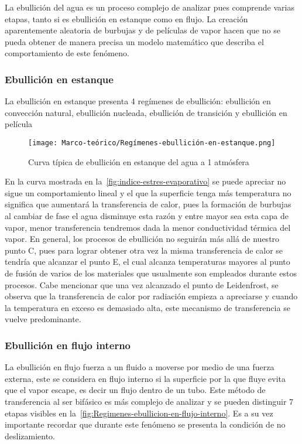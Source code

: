 		La ebullición del agua es un proceso complejo de analizar pues comprende varias etapas, tanto si es ebullición en estanque como en flujo. La creación aparentemente aleatoria de burbujas y de películas de vapor hacen que no se pueda obtener de manera precisa un modelo matemático que describa el comportamiento de este fenómeno.

		\subsubsection{Ebullición en estanque}

			La ebullición en estanque presenta 4 regímenes de ebullición: ebullición en convección natural, ebullición nucleada, ebullición de transición y ebullición en película

			\begin{figure}[ht]
				\centering
				\texttt{[image: Marco-teórico/Regímenes-ebullición-en-estanque.png]}
				\caption{Curva típica de ebullición en estanque del agua a 1 atmósfera}
				\label{fig:regimenes-ebullicion-en-estanque}
			\end{figure}

			En la curva mostrada en la~\cref{fig:indice-estres-evaporativo} se puede apreciar no sigue un comportamiento lineal y el que la superficie tenga más temperatura no significa que aumentará la transferencia de calor, pues la formación de burbujas al cambiar de fase el agua disminuye esta razón y entre mayor sea esta capa de vapor, menor transferencia tendremos dada la menor conductividad térmica del vapor. En general, los procesos de ebullición no seguirán más allá de nuestro punto C, pues para lograr obtener otra vez la misma transferencia de calor se tendría que alcanzar el punto E, el cual alcanza temperaturas mayores al punto de fusión de varios de los materiales que usualmente son empleados durante estos procesos. Cabe mencionar que una vez alcanzado el punto de Leidenfrost, se observa que la transferencia de calor por radiación empieza a apreciarse y cuando la temperatura en exceso es demasiado alta, este mecanismo de transferencia se vuelve predominante.

		\subsubsection{Ebullición en flujo interno}

			La ebullición en flujo fuerza a un fluido a moverse por medio de una fuerza externa, este se considera en flujo interno si la superficie por la que fluye evita que el vapor escape, es decir un flujo dentro de un tubo. Este método de transferencia al ser bifásico es más complejo de analizar y se pueden distinguir 7 etapas visibles en la~\cref{fig:Regimenes-ebullicion-en-flujo-interno}. Es a su vez importante recordar que durante este fenómeno se presenta la condición de no deslizamiento.


